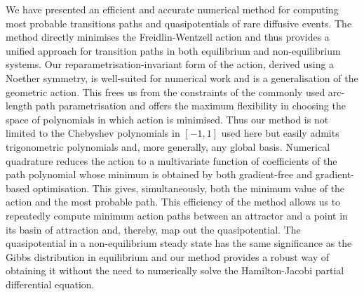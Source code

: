 \documentclass[]{cam-thesis}
\begin{document}
We have presented an efficient and accurate numerical method for computing
most probable transitions paths and quasipotentials of rare diffusive
events. The method directly minimises the Freidlin-Wentzell action
and thus provides a unified approach for transition
paths in both equilibrium and non-equilibrium systems. Our reparametrisation-invariant
form of the action, derived using a Noether symmetry, is well-suited
for numerical work and is a generalisation of the geometric action.
This frees us from the constraints of the commonly used arc-length
path parametrisation and offers the maximum flexibility in choosing
the space of polynomials in which action is minimised. Thus our method
is not limited to the Chebyshev polynomials in $[-1,1]$ used here
but easily admits trigonometric polynomials and, more generally, any
global basis. Numerical quadrature reduces the action to a multivariate
function of coefficients of the path polynomial whose minimum is obtained
by both gradient-free and gradient-based optimisation. This gives,
simultaneously, both the minimum value of the action and the most
probable path. This efficiency of the method allows us to repeatedly
compute minimum action paths between an attractor and a point in its
basin of attraction and, thereby, map out the quasipotential. The
quasipotential in a non-equilibrium steady state has the same significance
as the Gibbs distribution in equilibrium and our method provides a
robust way of obtaining it without the need to numerically solve the
Hamilton-Jacobi partial differential equation. 
\end{document}
